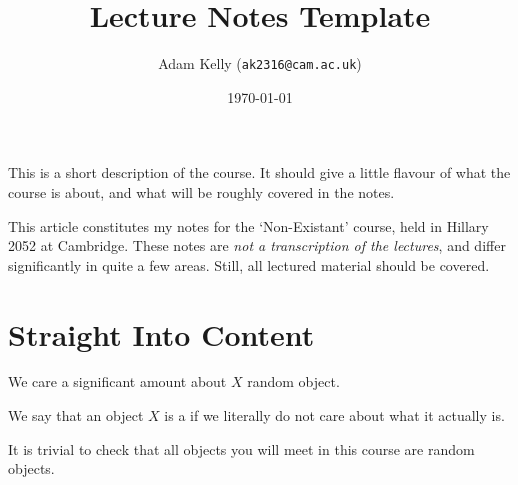 \documentclass[a4paper]{scrartcl}
\title{Lecture Notes Template}
\author{Adam Kelly (\texttt{ak2316@cam.ac.uk})}
\date{\today}
\begin{document}
\maketitle

This is a short description of the course. It should give a little flavour of what the course is about, and what will be roughly covered in the notes.

This article constitutes my notes for the `Non-Existant' course, held in Hillary 2052 at Cambridge. These notes are \emph{not a transcription of the lectures}, and differ significantly in quite a few areas. Still, all lectured material should be covered.



\tableofcontents


\section{Straight Into Content} 


We care a significant amount about $X$ random object.

\begin{definition}
    We say that an object $X$ is a  if we literally do not care about what it actually is.
\end{definition}

It is trivial to check that all objects you will meet in this course are random objects.
\end{document}
